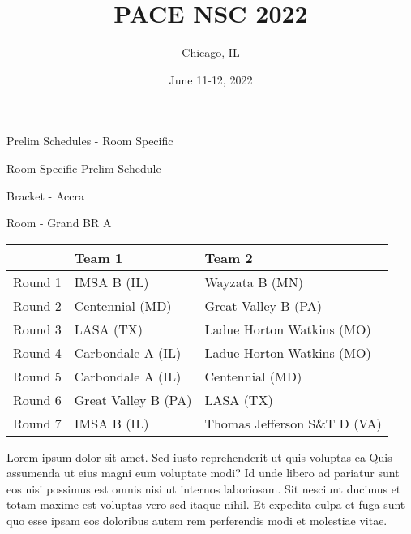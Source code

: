 \documentclass{article}%
\title{PACE NSC 2022}%
\author{Chicago, IL}%
\date{June 11{-}12, 2022}%
\begin{document}
%
\normalsize%
%
\maketitle%
\vspace*{48pt}%
\begin{center}%
\begin{Huge}%
Prelim Schedules {-} Room Specific%
\end{Huge}%
\end{center}%
\newpage%
\begin{center}%
\begin{Huge}%
Room Specific Prelim Schedule%
\end{Huge}%
\vspace*{8pt}%
\linebreak%
\begin{Large}%
Bracket {-} Accra%
\end{Large}%
\vspace*{8pt}%
\linebreak%
\vspace*{8pt}%
\begin{Large}%
Room {-} Grand BR A%
\end{Large}%
\end{center}%
%
\begin{tabularx}{\textwidth}{|c|Y|Y|}%
\hline%
&Team 1&Team 2\\%
\hline%
Round 1&IMSA B (IL)&Wayzata B (MN)\\%
Round 2&Centennial (MD)&Great Valley B (PA)\\%
Round 3&LASA (TX)&Ladue Horton Watkins (MO)\\%
Round 4&Carbondale A (IL)&Ladue Horton Watkins (MO)\\%
Round 5&Carbondale A (IL)&Centennial (MD)\\%
Round 6&Great Valley B (PA)&LASA (TX)\\%
Round 7&IMSA B (IL)&Thomas Jefferson S\&T D (VA)\\%
\hline%
\end{tabularx}%
\vspace*{8pt}%
\newline%
Lorem ipsum dolor sit amet. Sed iusto reprehenderit ut quis voluptas ea Quis assumenda ut eius magni eum voluptate modi? Id unde libero ad pariatur sunt eos nisi possimus est omnis nisi ut internos laboriosam. Sit nesciunt ducimus et totam maxime est voluptas vero sed itaque nihil. Et expedita culpa et fuga sunt quo esse ipsam eos doloribus autem rem perferendis modi et molestiae vitae.\newline%
\end{document}
